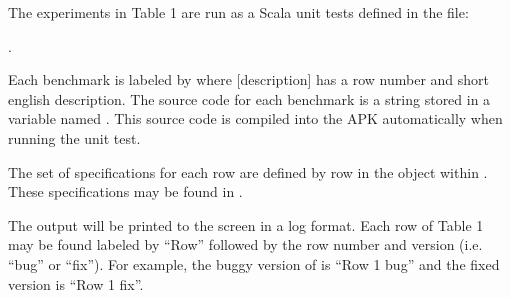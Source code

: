 \documentclass{acmart} %
\begin{document}
The experiments in Table 1 are run as a Scala unit tests defined in the file: 

.  

Each benchmark is labeled by  where [description] has a row number and short english description.
The source code for each benchmark is a string stored in a variable named .
This source code is compiled into the APK automatically when running the unit test.

The set of \newls specifications for each row are defined by row in the  object within .  These specifications may be found in .

The output will be printed to the screen in a log format.  Each row of Table 1 may be found labeled by ``Row'' followed by the row number and version (i.e. ``bug'' or ``fix'').  For example, the buggy version of \apGa is ``Row 1 bug'' and the fixed version is ``Row 1 fix''.  

\newcommand{\cTimeout}{\showclock{0}{45}}
\newsavebox{\cSafeBox}
\newcommand{\cSafe}{
\usebox{\cSafeBox}
}

\newsavebox{\cSafeToFiveBox}
\newcommand{\cSafeToFive}{
\usebox{\cSafeToFiveBox}
}

\newsavebox{\cAlarmBox}
\newcommand{\cAlarm}{\usebox{\cAlarmBox}}
%
\end{document}
